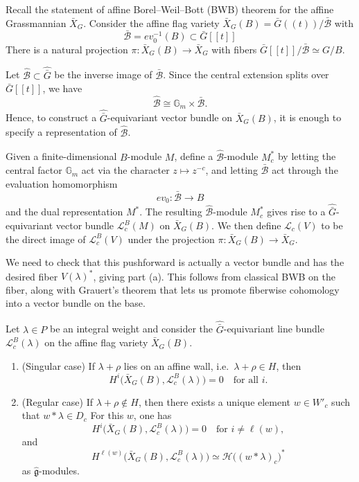 \documentclass[12pt]{article}
\begin{document}
Recall the statement of affine Borel--Weil--Bott (BWB) theorem for the affine Grassmannian $\bar X_G$. Consider the affine flag variety $\bar X_G(B)=\bar G((t))/\bar{\mathcal B}$ with
\[\bar{\mathcal B}=ev_0^{-1}(B)\subset \bar G[[t]]\] There is a natural projection $\pi:\bar X_G(B)\to \bar X_G$ with fibers $\bar{G}[[t]]/\bar{\mathcal B}\simeq G/B$. 

Let \(\widehat{\mathcal B}\subset \widehat{\bar G}\) be the inverse image of \(\bar{\mathcal B}\). Since the central extension splits over \(\bar G[[t]]\), we have
\[
\widehat{\mathcal B}\cong \mathbb G_m\times \bar{\mathcal B}.
\]
Hence, to construct a \(\widehat{\bar G}\)-equivariant vector bundle on \(\bar X_G(B)\), it is enough to specify a representation of \(\widehat{\mathcal B}\).

Given a finite-dimensional \(B\)-module \(M\), define a \(\widehat{\mathcal B}\)-module \(M_c^*\) by letting the central factor \(\mathbb G_m\) act via the character \(z\mapsto z^{-c}\), and letting \(\bar{\mathcal B}\) act through the evaluation homomorphism
\[
ev_0:\bar{\mathcal B}\to B
\]
and the dual representation \(M^*\). The resulting \(\widehat{\mathcal B}\)-module \(M_c^*\) gives rise to a \(\widehat{\bar G}\)-equivariant vector bundle \(\mathcal L_c^B(M)\) on \(\bar X_G(B)\). We then define \(\mathcal L_c(V)\) to be the direct image of \(\mathcal L_c^B(V)\) under the projection \(\pi:\bar X_G(B)\to \bar X_G\).

We need to check that this pushforward is actually a vector bundle and has the desired fiber $V(\lambda)^*$, giving part (a). This follows from classical BWB on the fiber, along with Grauert's theorem that lets us promote fiberwise cohomology into a vector bundle on the base.

\begin{theorem}\label{thm:affine-bwb}
Let $\lambda\in P$ be an integral weight and consider the $\widehat{\bar G}$-equivariant line bundle $\mathcal L_c^B(\lambda)$
on the affine flag variety $\bar X_G(B)$.

\begin{enumerate}[(1)]
\item (Singular case)  
If $\lambda+\rho$ lies on an affine wall, i.e.\ $\lambda+\rho\in H$, then
\[
H^i\bigl(\bar X_G(B),\mathcal L_c^B(\lambda)\bigr)=0
\quad\text{for all } i.
\]

\item (Regular case)  
If $\lambda+\rho\notin H$, then there exists a unique element $w\in W'_c$ such that $w*\lambda \in D_c$
For this $w$, one has
\[
H^i\bigl(\bar X_G(B),\mathcal L_c^B(\lambda)\bigr)=0
\quad\text{for } i\neq \ell(w),
\]
and
\[
H^{\ell(w)}\bigl(\bar X_G(B),\mathcal L_c^B(\lambda)\bigr)
\simeq \mathcal H\bigl((w*\lambda)_c\bigr)^*
\]
as $\widehat{\mathfrak g}$-modules.
\end{enumerate}
\end{theorem}
\end{document}
